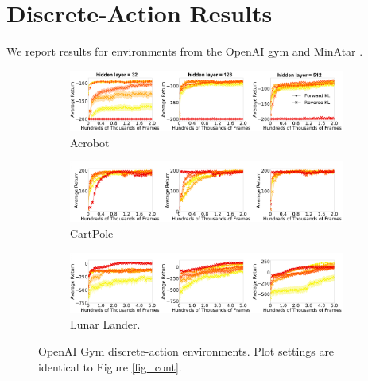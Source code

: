 \documentclass[twoside,11pt]{article}
\begin{document}
\section{Discrete-Action Results}
We report results for environments from the OpenAI gym \citep{brockman2016openai} and MinAtar \citep{young2019minatar}. 



\begin{figure}[t]
  \centering
  \begin{subfigure}[b]{1\linewidth}
    \centering
    \includegraphics[width=\columnwidth]{figs/deep/discrete/acrobot_combined.png} 
    \caption{Acrobot}\label{fig:acrobot}
  \end{subfigure}%
  
  \begin{subfigure}[b]{1\linewidth}
    \centering
    \includegraphics[width=\columnwidth]{figs/deep/discrete/cartpole_combined.png}
    \caption{CartPole}\label{fig:cartpole}
  \end{subfigure}
  
  \begin{subfigure}[b]{1\linewidth}
    \centering
    \includegraphics[width=\columnwidth]{figs/deep/discrete/lunar_combined.png}
    \caption{Lunar Lander.}
    \label{fig:lunar-lander}
  \end{subfigure}
  \caption{OpenAI Gym discrete-action environments. Plot settings are identical to Figure \ref{fig_cont}.}\label{fig:open-ai}
\end{figure}
\end{document}
